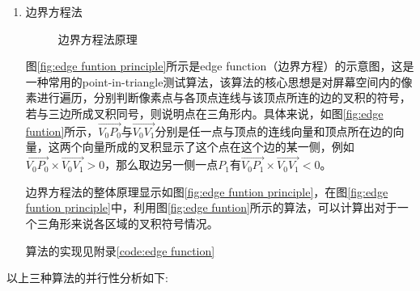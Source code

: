 \begin{enumerate}
\item 边界方程法
\begin{figure}[ht]
    \centering
    \caption{\label{fig:edge function ab}边界方程法原理}
\end{figure}
图\ref{fig:edge funtion principle}所示是edge function（边界方程）的示意图，这是一种常用的point-in-triangle测试算法，该算法的核心思想是对屏幕空间内的像素进行遍历，分别判断像素点与各顶点连线与该顶点所连的边的叉积的符号，若与三边所成叉积同号，则说明点在三角形内。具体来说，如图\ref{fig:edge funtion}所示，$\overrightarrow{V_0P_0}$与$\overrightarrow{V_0V_1}$分别是任一点与顶点的连线向量和顶点所在边的向量，这两个向量所成的叉积显示了这个点在这个边的某一侧，例如$\overrightarrow{V_0P_0}\times \overrightarrow{V_0V_1} > 0$，那么取边另一侧一点$P_1$有$\overrightarrow{V_0P_1}\times \overrightarrow{V_0V_1} < 0$。



边界方程法的整体原理显示如图\ref{fig:edge funtion principle}，在图\ref{fig:edge funtion principle}中，利用图\ref{fig:edge funtion}所示的算法，可以计算出对于一个三角形来说各区域的叉积符号情况。





算法的实现见附录\ref{code:edge function}

\end{enumerate}

以上三种算法的并行性分析如下:

